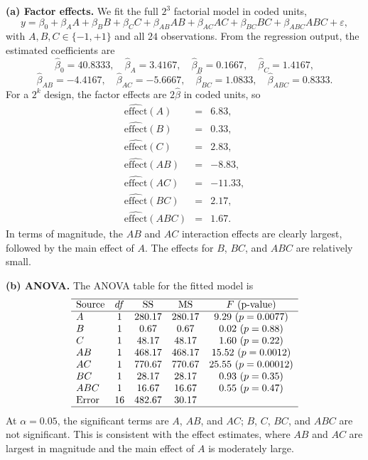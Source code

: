 \documentclass[answers,12pt,addpoints]{exam}
\begin{document}
\begin{solution}

\textbf{(a) Factor effects.}
We fit the full $2^3$ factorial model in coded units,
\[
y = \beta_0 + \beta_A A + \beta_B B + \beta_C C + \beta_{AB} AB + \beta_{AC} AC + \beta_{BC} BC + \beta_{ABC} ABC + \varepsilon,
\]
with $A,B,C \in \{-1,+1\}$ and all $24$ observations. From the regression output, the estimated coefficients are
\[
\hat\beta_0 = 40.8333,\quad
\hat\beta_A = 3.4167,\quad
\hat\beta_B = 0.1667,\quad
\hat\beta_C = 1.4167,
\]
\[
\hat\beta_{AB} = -4.4167,\quad
\hat\beta_{AC} = -5.6667,\quad
\hat\beta_{BC} = 1.0833,\quad
\hat\beta_{ABC} = 0.8333.
\]
For a $2^k$ design, the factor effects are $2\hat\beta$ in coded units, so
\[
\begin{array}{lcl}
\hat{\text{effect}}(A) &=& 6.83,\\
\hat{\text{effect}}(B) &=& 0.33,\\
\hat{\text{effect}}(C) &=& 2.83,\\
\hat{\text{effect}}(AB) &=& -8.83,\\
\hat{\text{effect}}(AC) &=& -11.33,\\
\hat{\text{effect}}(BC) &=& 2.17,\\
\hat{\text{effect}}(ABC) &=& 1.67.
\end{array}
\]
In terms of magnitude, the $AB$ and $AC$ interaction effects are clearly largest, followed by the main effect of $A$. The effects for $B$, $BC$, and $ABC$ are relatively small.

\medskip
\textbf{(b) ANOVA.}
The ANOVA table for the fitted model is
\[
\begin{array}{lcccc}
\hline
\text{Source} & df & \text{SS} & \text{MS} & F~(\text{p-value}) \\
\hline
A   & 1 & 280.17 & 280.17 &  9.29  ~(p = 0.0077) \\
B   & 1 &   0.67 &   0.67 &  0.02  ~(p = 0.88) \\
C   & 1 &  48.17 &  48.17 &  1.60  ~(p = 0.22) \\
AB  & 1 & 468.17 & 468.17 & 15.52 ~(p = 0.0012) \\
AC  & 1 & 770.67 & 770.67 & 25.55 ~(p = 0.00012) \\
BC  & 1 &  28.17 &  28.17 &  0.93  ~(p = 0.35) \\
ABC & 1 &  16.67 &  16.67 &  0.55  ~(p = 0.47) \\
\text{Error} & 16 & 482.67 & 30.17 & \\
\hline
\end{array}
\]
At $\alpha = 0.05$, the significant terms are $A$, $AB$, and $AC$; $B$, $C$, $BC$, and $ABC$ are not significant. This is consistent with the effect estimates, where $AB$ and $AC$ are largest in magnitude and the main effect of $A$ is moderately large.


\end{solution}
\end{document}
